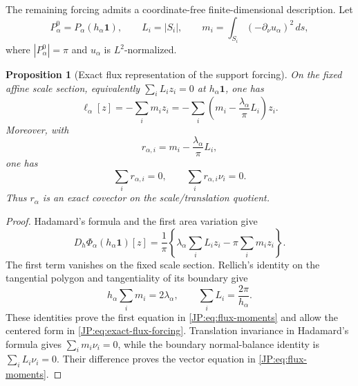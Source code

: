 \documentclass[11pt]{amsart}
\numberwithin{equation}{section}
\newtheorem{proposition}[theorem]{Proposition}
\theoremstyle{definition}
\theoremstyle{remark}
\begin{document}
The remaining forcing admits a coordinate-free finite-dimensional
description.  Let
\begin{equation}\label{JP:eq:side-masses}
 P_\alpha^0=P_\alpha(h_\alpha\mathbf1),\qquad
 L_i=|S_i|,\qquad
 m_i=\int_{S_i}(-\partial_\nu u_\alpha)^2\,ds,
\end{equation}
where $|P_\alpha^0|=\pi$ and $u_\alpha$ is $L^2$-normalized.

\begin{proposition}[Exact flux representation of the support forcing]
\label{JP:prop:flux-forcing}
On the fixed affine scale section, equivalently
\(
 \sum_iL_i z_i=0
\)
at $h_\alpha\mathbf1$, one has
\begin{equation}\label{JP:eq:exact-flux-forcing}
 \boxed{
 \ell_\alpha[z]
 =-\sum_i m_i z_i
 =-\sum_i\left(m_i-\frac{\lambda_\alpha}{\pi}L_i\right)z_i.}
\end{equation}
Moreover, with
\begin{equation}\label{JP:eq:centered-flux}
 r_{\alpha,i}=m_i-\frac{\lambda_\alpha}{\pi}L_i,
\end{equation}
one has
\begin{equation}\label{JP:eq:flux-moments}
 \sum_i r_{\alpha,i}=0,
 \qquad
 \sum_i r_{\alpha,i}\nu_i=0.
\end{equation}
Thus $r_\alpha$ is an exact covector on the scale/translation quotient.
\end{proposition}

\begin{proof}
Hadamard's formula and the first area variation give
\[
 D_h\Phi_\alpha(h_\alpha\mathbf1)[z]
 =\frac1\pi\left\{
 \lambda_\alpha\sum_iL_i z_i-\pi\sum_i m_i z_i\right\}.
\]
The first term vanishes on the fixed scale section.  Rellich's identity
on the tangential polygon and tangentiality of its boundary give
\[
 h_\alpha\sum_i m_i=2\lambda_\alpha,
 \qquad
 \sum_iL_i=\frac{2\pi}{h_\alpha}.
\]
These identities prove the first equation in \eqref{JP:eq:flux-moments} and
allow the centered form in \eqref{JP:eq:exact-flux-forcing}.  Translation
invariance in Hadamard's formula gives
$\sum_i m_i\nu_i=0$, while the boundary normal-balance identity is
$\sum_iL_i\nu_i=0$.  Their difference proves the vector equation in
\eqref{JP:eq:flux-moments}.
\end{proof}
\end{document}
